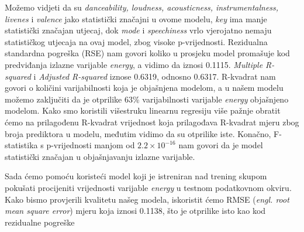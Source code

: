 	Možemo vidjeti da su \textit{danceability, loudness, acousticness, instrumentalness, livenes} i \textit{valence} jako statistički značajni u ovome modelu, \textit{key} ima manje statistički značajan utjecaj, dok \textit{mode} i \textit{speechiness} vrlo vjerojatno nemaju statističkog utjecaja na ovaj model, zbog visoke p-vrijednosti.
	Rezidualna standardna pogreška (RSE) nam govori koliko u prosjeku model promašuje kod predviđanja izlazne varijable \textit{energy}, a vidimo da iznosi 0.1115.
	\textit{Multiple R-squared} i \textit{Adjusted R-squared} iznose 0.6319, odnosno 0.6317. R-kvadrat nam govori o količini varijabilnosti koja je objašnjena modelom, a u našem modelu možemo zaključiti da je otprilike 63\% varijabilnosti varijable \textit{energy} objašnjeno modelom. Kako smo koristili višestruku linearnu regresiju više pažnje obratit ćemo na prilagođenu R-kvadrat vrijednost koja prilagođava R-kvadrat mjeru zbog broja prediktora u modelu, međutim vidimo da su otprilike iste.
	Konačno, F-statistika s p-vrijednosti manjom od \(2.2 \times 10^{-16}\) nam govori da je model statistički značajan u objašnjavanju izlazne varijable.
	
	Sada ćemo pomoću koristeći model koji je istreniran nad trening skupom pokušati procijeniti vrijednosti varijable \textit{energy} u testnom podatkovnom okviru. Kako bismo provjerili kvalitetu našeg modela, iskoristit ćemo RMSE (\textit{engl. root mean square error}) mjeru koja iznosi 0.1138, što je otprilike isto kao kod rezidualne pogreške
\eject



